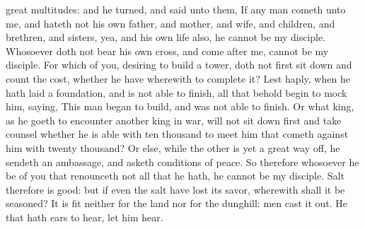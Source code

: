 great multitudes: and he turned, and said unto them, If any man cometh unto me, and hateth not his own father, and mother, and wife, and children, and brethren, and sisters, yea, and his own life also, he cannot be my disciple. Whosoever doth not bear his own cross, and come after me, cannot be my disciple. For which of you, desiring to build a tower, doth not first sit down and count the cost, whether he have wherewith to complete it? Lest haply, when he hath laid a foundation, and is not able to finish, all that behold begin to mock him, saying, This man began to build, and was not able to finish. Or what king, as he goeth to encounter another king in war, will not sit down first and take counsel whether he is able with ten thousand to meet him that cometh against him with twenty thousand? Or else, while the other is yet a great way off, he sendeth an ambassage, and asketh conditions of peace. So therefore whosoever he be of you that renounceth not all that he hath, he cannot be my disciple. Salt therefore is good: but if even the salt have lost its savor, wherewith shall it be seasoned? It is fit neither for the land nor for the dunghill: men cast it out. He that hath ears to hear, let him hear. 

